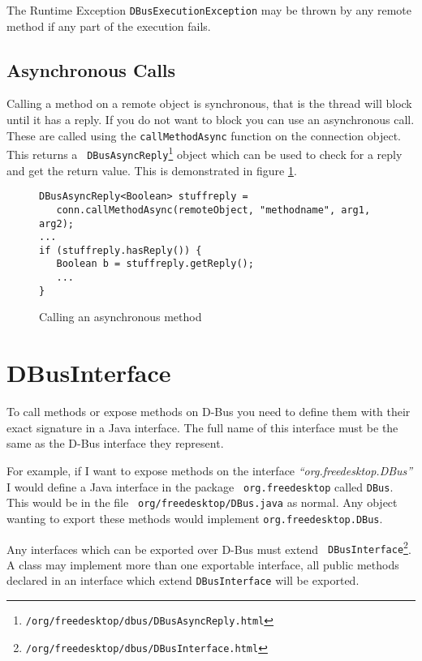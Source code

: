 \documentclass[a4paper,12pt]{article}
\begin{document}
The Runtime Exception {\tt DBusExecutionException} may be thrown
by any remote method if any part of the execution fails.

\subsection{Asynchronous Calls}

Calling a method on a remote object is synchronous, that is the thread will
block until it has a reply. If you do not want to block you can use an
asynchronous call. These are called using the {\tt callMethodAsync} function on
the connection object. This returns a {\tt
DBusAsyncReply\footnote{\javadocroot/org/freedesktop/dbus/DBusAsyncReply.html}}
object which can be used to check for a reply and get the return value. This is demonstrated in figure \ref{fig:async}.

\begin{figure}[htb]
\begin{center}
\begin{verbatim}
DBusAsyncReply<Boolean> stuffreply = 
   conn.callMethodAsync(remoteObject, "methodname", arg1, arg2);
...
if (stuffreply.hasReply()) {
   Boolean b = stuffreply.getReply();
   ...
}
\end{verbatim}
\end{center}
\caption{Calling an asynchronous method}
\label{fig:async}
\end{figure}


\section{DBusInterface}

To call methods or expose methods on D-Bus you need to define them with their
exact signature in a Java interface. The full name of this interface must be
the same as the D-Bus interface they represent.

For example, if I want to expose methods on the interface {\em
``org.freedesktop.DBus''} I would define a Java interface in the package {\tt
org.freedesktop} called {\tt DBus}. This would be in the file {\tt
org/freedesktop/DBus.java} as normal. Any object wanting to export these
methods would implement {\tt org.freedesktop.DBus}.

Any interfaces which can be exported over D-Bus must extend {\tt
DBusInterface\footnote{\javadocroot/org/freedesktop/dbus/DBusInterface.html}}.
A class may implement more than one exportable interface, all public methods
declared in an interface which extend {\tt DBusInterface} will be exported.
\end{document}
